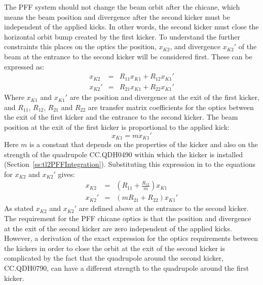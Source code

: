 The PFF system should not change the beam orbit after the chicane, which means the beam position and divergence after the second kicker must be independent of the applied kicks. In other words, the second kicker must close the horizontal orbit bump created by the first kicker. To understand the further constraints this places on the optics the position, \(x_{K2}\), and divergence \(x_{K2}'\) of the beam at the entrance to the second kicker will be considered first. These can be expressed as:
\begin{eqnarray}
x_{K2} &=& R_{11}x_{K1} + R_{12}x_{K1}' \\
x_{K2}' &=& R_{21}x_{K1} + R_{22}x_{K1}'
\end{eqnarray}
Where \(x_{K1}\) and \(x_{K1}'\) are the position and divergence at the exit of the first kicker, and \(R_{11}\), \(R_{12}\), \(R_{21}\) and \(R_{22}\) are transfer matrix coefficients for the optics between the exit of the first kicker and the entrance to the second kicker. The beam position at the exit of the first kicker is proportional to the applied kick:
\begin{equation}
x_{K1} = m x_{K1}'
\end{equation}
Here \(m\) is a constant that depends on the properties of the kicker and also on the strength of the quadrupole CC.QDH0490 within which the kicker is installed (Section~\ref{ss:tl2PFFIntegration}). Substituting this expression in to the equations for \(x_{K2}\) and \(x_{K2}'\) gives:
\begin{eqnarray}
x_{K2} &=& \left(R_{11} + \frac{R_{12}}{m}\right)x_{K1} \\
x_{K2}' &=& (m R_{21} + R_{22})x_{K1}'
\end{eqnarray}
As stated \(x_{K2}\) and \(x_{K2}'\) are defined above at the entrance to the second kicker. The requirement for the PFF chicane optics is that the position and divergence at the exit of the second kicker are zero independent of the applied kicks. However, a derivation of the exact expression for the optics requirements between the kickers in order to close the orbit at the exit of the second kicker is complicated by the fact that the quadrupole around the second kicker, CC.QDH0790, can have a different strength to the quadrupole around the first kicker. 

